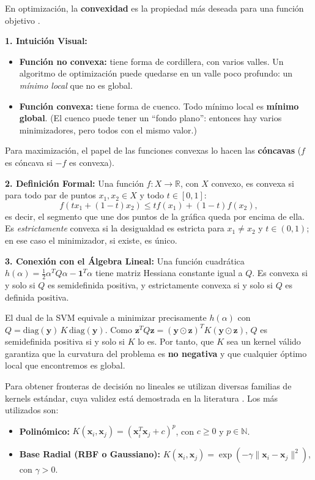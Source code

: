 \documentclass[12pt, a4paper]{article}
\begin{document}
\begin{tcolorbox}[colback=teal!5!white,colframe=teal!75!black,title=\textbf{Nota Teórica: Convexidad y Óptimos Locales vs. Globales}]
En optimización, la \textbf{convexidad} es la propiedad más deseada para una función objetivo \cite{boyd2004convex}.

\textbf{1. Intuición Visual:}
\begin{itemize}
    \item \textbf{Función no convexa:} tiene forma de cordillera, con varios valles. Un algoritmo de optimización puede quedarse en un valle poco profundo: un \textit{mínimo local} que no es global.
    \item \textbf{Función convexa:} tiene forma de cuenco. Todo mínimo local es \textbf{mínimo global}. (El cuenco puede tener un ``fondo plano'': entonces hay varios minimizadores, pero todos con el mismo valor.)
\end{itemize}
Para maximización, el papel de las funciones convexas lo hacen las \textbf{cóncavas} ($f$ es cóncava si $-f$ es convexa).

\textbf{2. Definición Formal:}
Una función $f: X \to \mathbb{R}$, con $X$ convexo, es convexa si para todo par de puntos $x_1, x_2 \in X$ y todo $t \in [0, 1]$:
\[ f(tx_1 + (1-t)x_2) \leq t f(x_1) + (1-t)f(x_2), \]
es decir, el segmento que une dos puntos de la gráfica queda por encima de ella. Es \textit{estrictamente} convexa si la desigualdad es estricta para $x_1 \neq x_2$ y $t \in (0,1)$; en ese caso el minimizador, si existe, es único.

\textbf{3. Conexión con el Álgebra Lineal:}
Una función cuadrática $h(\alpha) = \frac12 \alpha^T Q \alpha - \mathbf{1}^T\alpha$ tiene matriz Hessiana constante igual a $Q$. Es convexa si y solo si $Q$ es semidefinida positiva, y estrictamente convexa si y solo si $Q$ es definida positiva.

El dual de la SVM equivale a minimizar precisamente $h(\alpha)$ con $Q = \mathrm{diag}(\mathbf{y})\, K\, \mathrm{diag}(\mathbf{y})$. Como $\mathbf{z}^T Q \mathbf{z} = (\mathbf{y}\odot\mathbf{z})^T K (\mathbf{y}\odot\mathbf{z})$, $Q$ es semidefinida positiva si y solo si $K$ lo es. Por tanto, que $K$ sea un kernel válido garantiza que la curvatura del problema es \textbf{no negativa} y que cualquier óptimo local que encontremos es global.
\end{tcolorbox}

\noindent Para obtener fronteras de decisión no lineales se utilizan diversas familias de kernels estándar, cuya validez está demostrada en la literatura \cite{hastie2009elements, bishop2006pattern}. Los más utilizados son:
\begin{itemize}
    \item \textbf{Polinómico:} $K(\mathbf{x}_i, \mathbf{x}_j) = (\mathbf{x}_i^T \mathbf{x}_j + c)^p$, con $c \geq 0$ y $p \in \mathbb{N}$.
    \item \textbf{Base Radial (RBF o Gaussiano):} $K(\mathbf{x}_i, \mathbf{x}_j) = \exp\left(-\gamma \|\mathbf{x}_i - \mathbf{x}_j\|^2\right)$, con $\gamma > 0$.
\end{itemize}
\end{document}
